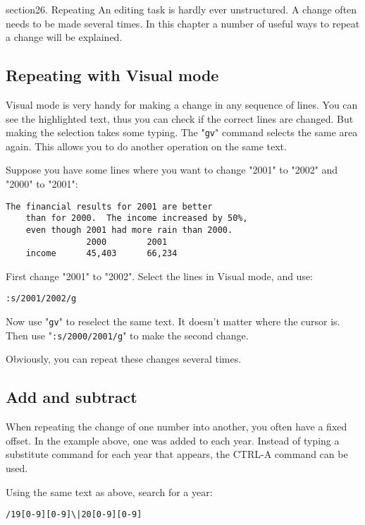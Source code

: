 section{26. Repeating}
An editing task is hardly ever unstructured.
A change often needs to be made several times.
In this chapter a number of useful ways to repeat a change will be explained.
\subsection{Repeating with Visual mode}
Visual mode is very handy for making a change in any sequence of lines.
You can see the highlighted text, thus you can check if the correct lines are changed.
But making the selection takes some typing.
The "\texttt{gv}" command selects the same area again.
This allows you to do another operation on the same text.

Suppose you have some lines where you want to change "2001" to "2002" and "2000" to "2001":

\begin{Verbatim}[samepage=true]
    The financial results for 2001 are better 
    than for 2000.  The income increased by 50%, 
    even though 2001 had more rain than 2000. 
                2000        2001 
    income      45,403      66,234 
\end{Verbatim}

First change "2001" to "2002".  Select the lines in Visual mode, and use:

\begin{Verbatim}[samepage=true]
 :s/2001/2002/g
\end{Verbatim}

Now use "\texttt{gv}" to reselect the same text.
It doesn't matter where the cursor is.
Then use "\texttt{:s/2000/2001/g}" to make the second change.

Obviously, you can repeat these changes several times.
\subsection{Add and subtract}
When repeating the change of one number into another, you often have a fixed offset.
In the example above, one was added to each year.
Instead of typing a substitute command for each year that appears, the CTRL-A command can be used.

Using the same text as above, search for a year:

\begin{Verbatim}[samepage=true]
 /19[0-9][0-9]\|20[0-9][0-9]
\end{Verbatim}

